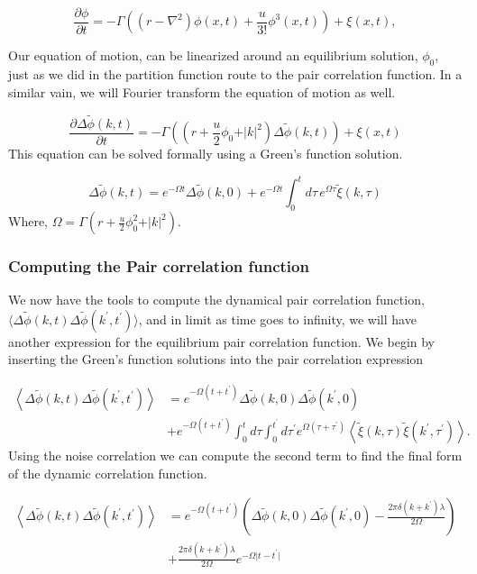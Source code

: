 \documentclass[11pt]{article}
\newcommand{\f}{\frac}
\newcommand{\fphi}{\tilde{\phi}}
\newcommand{\fxi}{\tilde{\xi}}
\renewcommand{\l}{\left}
\renewcommand{\r}{\right}
\begin{document}
\begin{equation}
\f{\partial \phi}{\partial t} = -\Gamma\left((r-\nabla^2)\phi(x,t) + \f{u}{3!}\phi^3(x,t)\right) + \xi(x, t),
\end{equation}

Our equation of motion, can be linearized around an equilibrium solution, $\phi_0$, just as we did in the partition function route to the pair correlation function. In a similar vain, we will Fourier transform the equation of motion as well. 

\begin{equation}
\f{\partial \Delta\fphi(k, t)}{\partial t} = -\Gamma\left((r + \f{u}{2}\phi_0 + \vert k \vert^2)\Delta\fphi(k,t)\right) + \xi(x,t)
\end{equation}
This equation can be solved formally using a Green's function solution.

\begin{equation}
\Delta\fphi(k, t) = e^{-\Omega t}\Delta\fphi(k, 0) + e^{-\Omega t}\int_0^t d\tau \,e^{\Omega \tau} \fxi(k, \tau)
\end{equation}
Where, $\Omega = \Gamma (r + \f{u}{2}\phi_0^2 + \vert k \vert^2)$.

\subsubsection{Computing the Pair correlation function}

We now have the tools to compute the dynamical pair correlation function, $\langle \Delta\fphi(k, t)\Delta\fphi(k^\prime, t^\prime) \rangle $, and in limit as time goes to infinity, we will have another expression for the equilibrium pair correlation function. We begin by inserting the Green's function solutions into the pair correlation expression 

\begin{align}
\l\langle \Delta\fphi(k, t) \Delta\fphi(k^\prime, t^\prime)\r\rangle &=  e^{-\Omega(t+t^\prime)}\Delta\fphi(k, 0)\Delta\fphi(k^\prime, 0) \nonumber \\
 &+ e^{-\Omega (t+t^\prime)} \int_0^t d\tau \int_0^{t^\prime} d\tau^\prime e^{\Omega(\tau+\tau^\prime)}\l\langle \fxi(k, \tau) \fxi(k^\prime, \tau^\prime) \r\rangle.
\end{align}
Using the noise correlation we can compute the second term to find the final form of the dynamic correlation function. 

\begin{align}
	\left\langle \Delta\fphi(k, t) \Delta\fphi(k^\prime, t^\prime)\right\rangle &=  e^{-\Omega(t+t^\prime)}\left(\Delta\fphi(k, 0)\Delta\fphi(k^\prime, 0) - \f{2\pi\delta(k+k^\prime)\lambda}{2\Omega}\right) \nonumber \\
	&+ \f{2\pi\delta(k+k^\prime)\lambda}{2\Omega}e^{-\Omega \vert t-t^\prime \vert}
\end{align}
\end{document}
